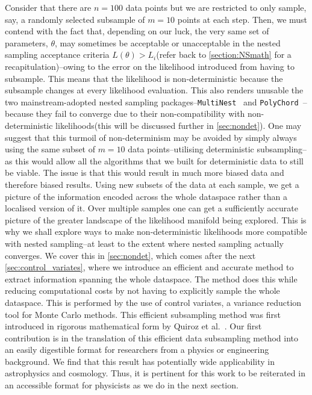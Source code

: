 Consider that there are $n=100$ data points but we are restricted to only sample, say, a randomly selected subsample of $m=10$ points at each step. Then, we must contend with the fact that, depending on our luck, the very same set of parameters, $\theta$, may sometimes be acceptable or unacceptable in the nested sampling acceptance criteria $L(\theta)>L_i$(refer back to \cref{section:NSmath} for a recapitulation)--owing to the error on the likelihood introduced from having to subsample. This means that the likelihood is non-deterministic because the subsample changes at every likelihood evaluation. This also renders unusable the two mainstream-adopted nested sampling packages--\texttt{MultiNest}~\cite{Feroz_2009} and \texttt{\texttt{PolyChord}}~\cite{Handley_2015}--because they fail to converge due to their non-compatibility with non-deterministic likelihoods(this will be discussed further in \cref{sec:nondet}). One may suggest that this turmoil of non-determinism may be avoided by simply always using the same subset of $m=10$ data points--utilising deterministic subsampling--as this would allow all the algorithms that we built for deterministic data to still be viable. The issue is that this would result in much more biased data and therefore biased results. Using new subsets of the data at each sample, we get a picture of the information encoded across the whole dataspace rather than a localised version of it. Over multiple samples one can get a sufficiently accurate picture of the greater landscape of the likelihood manifold being explored. This is why we shall explore ways to make non-deterministic likelihoods more compatible with nested sampling--at least to the extent where nested sampling actually converges. We cover this in \cref{sec:nondet}, which comes after the next \cref{sec:control_variates}, where we introduce an efficient and accurate method to extract information spanning the whole dataspace. The method does this while reducing computational costs by not having to explicitly sample the whole dataspace. This is performed by the use of control variates, a variance reduction tool for Monte Carlo methods. This efficient subsampling method was first introduced in rigorous mathematical form by Quiroz et al.~\cite{Quiroz_2018}. Our first contribution is in the translation of this efficient data subsampling method into an easily digestible format for researchers from a physics or engineering background. We find that this result has potentially wide applicability in astrophysics and cosmology. Thus, it is pertinent for this work to be reiterated in an accessible format for physicists as we do in the next section.


